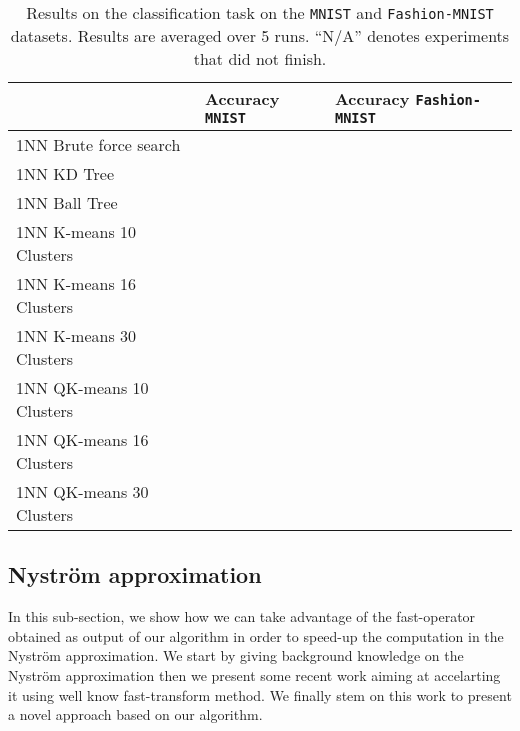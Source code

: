 \begin{table}[]

\centering
\begin{tabular}{@{}l|P{2.5cm}|P{2.5cm}}
\toprule
                                    & Accuracy \texttt{MNIST} & Accuracy \texttt{Fashion-MNIST} \\ \midrule
1NN Brute force search              &   &    \\
1NN KD Tree                         &   &    \\
1NN Ball Tree                       &   &    \\ \midrule \midrule
1NN K-means 10 Clusters            &   &    \\
1NN K-means 16 Clusters            &   &    \\
1NN K-means 30 Clusters            &   &    \\ \midrule
1NN QK-means 10 Clusters           &   &    \\
1NN QK-means 16 Clusters           &   &    \\
1NN QK-means 30 Clusters           &   &    \\ \midrule \midrule
\end{tabular}

\caption{Results on the classification task on the \texttt{MNIST} and \texttt{Fashion-MNIST} datasets. Results are averaged over 5 runs. ``N/A'' denotes experiments that did not finish.}
\label{table:results_mnist_fmnist}

\end{table}


\subsection{Nyström approximation}

In this sub-section, we show how we can take advantage of the fast-operator obtained as output of our \qkmeans algorithm in order to speed-up the computation in the Nyström approximation. We start by giving background knowledge on the Nyström approximation then we present some recent work aiming at accelarting it using well know fast-transform method. We finally stem on this work to present a novel approach based on our \qkmeans algorithm.

